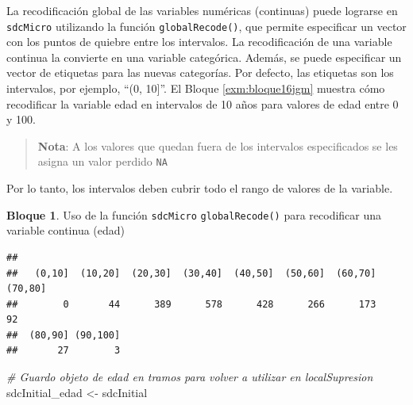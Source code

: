 \documentclass[]{book}
\newenvironment{Shaded}{\begin{snugshade}}{\end{snugshade}}
\newcommand{\CommentTok}[1]{\textcolor[rgb]{0.56,0.35,0.01}{\textit{#1}}}
\newcommand{\DataTypeTok}[1]{\textcolor[rgb]{0.13,0.29,0.53}{#1}}
\newcommand{\DecValTok}[1]{\textcolor[rgb]{0.00,0.00,0.81}{#1}}
\newcommand{\KeywordTok}[1]{\textcolor[rgb]{0.13,0.29,0.53}{\textbf{#1}}}
\newcommand{\NormalTok}[1]{#1}
\newcommand{\OperatorTok}[1]{\textcolor[rgb]{0.81,0.36,0.00}{\textbf{#1}}}
\newcommand{\StringTok}[1]{\textcolor[rgb]{0.31,0.60,0.02}{#1}}
\theoremstyle{definition}
\theoremstyle{definition}
\newtheorem{example}{Bloque}[chapter]
\theoremstyle{definition}
\theoremstyle{definition}
\theoremstyle{remark}
\begin{document}
La recodificación global de las variables numéricas (continuas) puede lograrse en \texttt{sdcMicro} utilizando la función \texttt{globalRecode()}, que permite especificar un vector con los puntos de quiebre entre los intervalos. La recodificación de una variable continua la convierte en una variable categórica. Además, se puede especificar un vector de etiquetas para las nuevas categorías. Por defecto, las etiquetas son los intervalos, por ejemplo, ``(0, 10{]}''. El Bloque \ref{exm:bloque16jgm} muestra cómo recodificar la variable edad en intervalos de 10 años para valores de edad entre 0 y 100.

\begin{quote}
\textbf{Nota}: A los valores que quedan fuera de los intervalos especificados se les asigna un valor perdido \texttt{NA}
\end{quote}

Por lo tanto, los intervalos deben cubrir todo el rango de valores de la variable.

\begin{example}
\protect\hypertarget{exm:bloque16jgm}{}{\label{exm:bloque16jgm} }Uso de la función \texttt{sdcMicro} \texttt{globalRecode()} para recodificar una variable continua (edad)
\end{example}

\begin{Shaded}
\end{Shaded}

\begin{verbatim}
## 
##   (0,10]  (10,20]  (20,30]  (30,40]  (40,50]  (50,60]  (60,70]  (70,80] 
##        0       44      389      578      428      266      173       92 
##  (80,90] (90,100] 
##       27        3
\end{verbatim}

\begin{Shaded}
\begin{Highlighting}[]
\CommentTok{# Guardo objeto de edad en tramos para volver a utilizar en localSupresion}
\NormalTok{sdcInitial_edad <-}\StringTok{ }\NormalTok{sdcInitial}
\end{Highlighting}
\end{Shaded}
\end{document}
